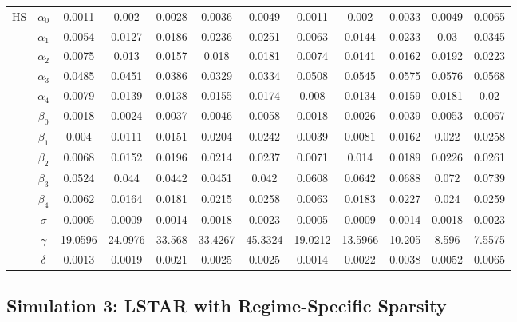 \begin{table}
\begin{tabular}{cc|ccccc|ccccc}
    \midrule
    HS & $\alpha_0$ & 0.0011 & 0.002 & 0.0028 & 0.0036 & 0.0049 & 0.0011 & 0.002 & 0.0033 & 0.0049 & 0.0065 \\
    & $\alpha_1$ & 0.0054 & 0.0127 & 0.0186 & 0.0236 & 0.0251 & 0.0063 & 0.0144 & 0.0233 & 0.03 & 0.0345 \\
    & $\alpha_2$ & 0.0075 & 0.013 & 0.0157 & 0.018 & 0.0181 & 0.0074 & 0.0141 & 0.0162 & 0.0192 & 0.0223 \\
    & $\alpha_3$ & 0.0485 & 0.0451 & 0.0386 & 0.0329 & 0.0334 & 0.0508 & 0.0545 & 0.0575 & 0.0576 & 0.0568 \\
   & $\alpha_4$ & 0.0079 & 0.0139 & 0.0138 & 0.0155 & 0.0174 & 0.008 & 0.0134 & 0.0159 & 0.0181 & 0.02 \\
    & $\beta_0$ & 0.0018 & 0.0024 & 0.0037 & 0.0046 & 0.0058 & 0.0018 & 0.0026 & 0.0039 & 0.0053 & 0.0067 \\
    & $\beta_1$ & 0.004 & 0.0111 & 0.0151 & 0.0204 & 0.0242 & 0.0039 & 0.0081 & 0.0162 & 0.022 & 0.0258 \\
    & $\beta_2$ & 0.0068 & 0.0152 & 0.0196 & 0.0214 & 0.0237 & 0.0071 & 0.014 & 0.0189 & 0.0226 & 0.0261 \\
   & $\beta_3$ & 0.0524 & 0.044 & 0.0442 & 0.0451 & 0.042 & 0.0608 & 0.0642 & 0.0688 & 0.072 & 0.0739 \\
    & $\beta_4$ & 0.0062 & 0.0164 & 0.0181 & 0.0215 & 0.0258 & 0.0063 & 0.0183 & 0.0227 & 0.024 & 0.0259 \\
    & $\sigma$ & 0.0005 & 0.0009 & 0.0014 & 0.0018 & 0.0023 & 0.0005 & 0.0009 & 0.0014 & 0.0018 & 0.0023 \\
   & $\gamma$ & 19.0596 & 24.0976 & 33.568 & 33.4267 & 45.3324 & 19.0212 & 13.5966 & 10.205 & 8.596 & 7.5575 \\
   & $\delta$ & 0.0013 & 0.0019 & 0.0021 & 0.0025 & 0.0025 & 0.0014 & 0.0022 & 0.0038 & 0.0052 & 0.0065 \\
    \bottomrule
    \end{tabular}%
  \label{tab:changingsigma}%
\end{table}%


\subsection{Simulation 3: LSTAR with Regime-Specific Sparsity}

